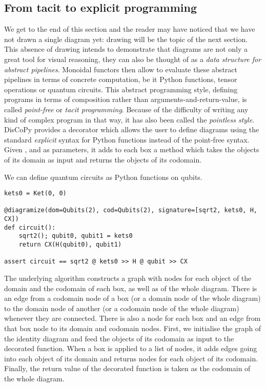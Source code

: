 \subsection{From tacit to explicit programming}\label{subsection:tacit-to-explicit}

We get to the end of this section and the reader may have noticed that we have not drawn a single diagram yet: drawing will be the topic of the next section.
This absence of drawing intends to demonstrate that diagrams are not only a great tool for visual reasoning, they can also be thought of as a \emph{data structure for abstract pipelines}.
Monoidal functors then allow to evaluate these abstract pipelines in terms of concrete computation, be it Python functions, tensor operations or quantum circuits.
This abstract programming style, defining programs in terms of composition rather than arguments-and-return-value, is called \emph{point-free} or \emph{tacit programming}.
Because of the difficulty of writing any kind of complex program in that way, it has also been called the \emph{pointless style}.
DisCoPy provides a  decorator which allows the user to define diagrams using the standard \emph{explicit} syntax for Python functions instead of the point-free syntax.
Given ,  and  as parameters, it adds to each box a  method which takes the objects of its domain as input and returns the objects of its codomain.

\begin{example}
We can define quantum circuits as Python functions on qubits.

\begin{verbatim}
kets0 = Ket(0, 0)

@diagramize(dom=Qubits(2), cod=Qubits(2), signature=[sqrt2, kets0, H, CX])
def circuit():
    sqrt2(); qubit0, qubit1 = kets0
    return CX(H(qubit0), qubit1)

assert circuit == sqrt2 @ kets0 >> H @ qubit >> CX
\end{verbatim}
\end{example}

The underlying algorithm constructs a graph with nodes for each object of the domain and the codomain of each box, as well as of the whole diagram.
There is an edge from a codomain node of a box (or a domain node of the whole diagram) to the domain node of another (or a codomain node of the whole diagram) whenever they are connected.
There is also a node for each box and an edge from that box node to its domain and codomain nodes.
First, we initialise the graph of the identity diagram and feed the objects of its codomain as input to the decorated function.
When a box is applied to a list of nodes, it adds edges going into each object of its domain and returns nodes for each object of its codomain.
Finally, the return value of the decorated function is taken as the codomain of the whole diagram.

